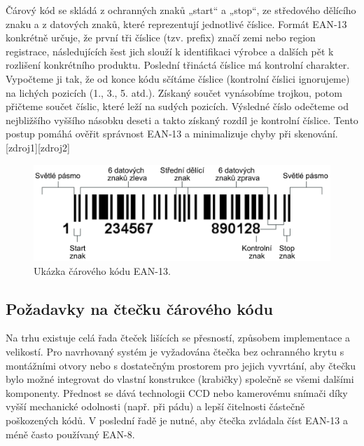 Čárový kód se skládá z ochranných znaků „start“ a „stop“, ze středového dělícího znaku a z datových znaků, které reprezentují jednotlivé číslice. Formát EAN‑13 konkrétně určuje, že první tři číslice (tzv. prefix) značí zemi nebo region registrace, následujících šest jich slouží k identifikaci výrobce a dalších pět k rozlišení konkrétního produktu. Poslední třináctá číslice má kontrolní charakter. Vypočteme ji tak, že od konce kódu sčítáme číslice (kontrolní číslici ignorujeme) na lichých pozicích (1., 3., 5. atd.). Získaný součet vynásobíme trojkou, potom přičteme součet číslic, které leží na sudých pozicích. Výsledné číslo odečteme od nejbližšího vyššího násobku deseti a takto získaný rozdíl je kontrolní číslice. Tento postup pomáhá ověřit správnost EAN‑13 a minimalizuje chyby při skenování. [zdroj1][zdroj2]

\begin{figure}[!h]
    \begin{center}
        \includegraphics[scale=0.15]{obrazky/čárový kód.png} %
    \end{center}
    \caption{Ukázka čárového kódu EAN-13.}
    \label{čárový kod}
\end{figure}





\subsection{Požadavky na čtečku čárového kódu}
Na trhu existuje celá řada čteček lišících se přesností, způsobem implementace a velikostí. Pro navrhovaný systém je vyžadována čtečka bez ochranného krytu s montážními otvory nebo s dostatečným prostorem pro jejich vyvrtání, aby čtečku bylo možné integrovat do vlastní konstrukce (krabičky) společně se všemi dalšími komponenty. Přednost se dává technologii CCD nebo kamerovému snímači díky vyšší mechanické odolnosti (např. při pádu) a lepší čitelnosti částečně poškozených kódů.
V poslední řadě je nutné, aby čtečka zvládala číst EAN-13 a méně často používaný EAN-8.

